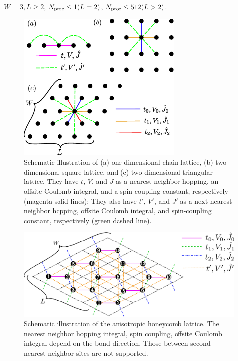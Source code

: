 \begin{itemize}
\begin{itemize}
    $W=3, L \geq 2$, $N_{\rm proc} \leq 1(L=2)$, $N_{\rm proc} \leq 512(L>2)$.

\end{itemize}

\begin{figure}[!htbp]
  \begin{center}
    \includegraphics[width=8cm]{../figs/chap04_1_lattice.eps}
    \caption{Schematic illustration of
      (a) one dimensional chain lattice, 
      (b) two dimensional square lattice, and 
      (c) two dimensional triangular lattice.
      They have $t$, $V$, and $J$ as a nearest neighbor hopping, an offsite Coulomb integral, 
      and a spin-coupling constant, respectively (magenta solid lines);
      They also have $t'$, $V'$, and $J'$ as a next nearest neighbor hopping, offsite Coulomb integral, 
      and spin-coupling constant, respectively (green dashed line).
    }
    \label{fig_chap04_1_lattice}
  \end{center}
\end{figure}

\begin{figure}[!htbp]
  \begin{center}
    \includegraphics[width=15cm]{../figs/chap04_1_honeycomb.eps}
    \caption{Schematic illustration of the anisotropic honeycomb lattice.
      The nearest neighbor 
      hopping integral, spin coupling, offsite Coulomb integral
      depend on the bond direction.
      Those between second nearest neighbor sites are not supported.
    }
    \label{fig_chap04_1_honeycomb}
  \end{center}
\end{figure}


\end{itemize}
